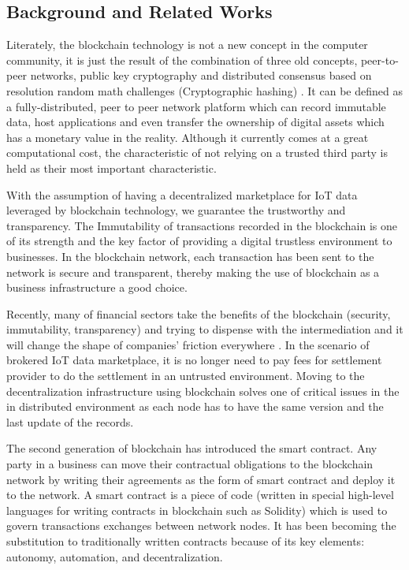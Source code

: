 \documentclass[letterpaper, 10 pt, conference]{ieeeconf}  %
\begin{document}
\subsection{Background and Related Works} \label{RelatedWork&Background}

Literately, the blockchain technology is not a new concept in the computer community, it is just the result of the combination of three old concepts, peer-to-peer networks, public key cryptography and distributed consensus based on resolution random math challenges (Cryptographic hashing) \cite{2}. It can be defined as a fully-distributed, peer to peer network platform which can record immutable data, host applications \cite{2} and even transfer the ownership of digital assets which has a monetary value in the reality. Although it currently comes at a great computational cost, the characteristic of not relying on a trusted third party is held as their most important characteristic.

With the assumption of having a decentralized marketplace for IoT data leveraged by blockchain technology, we guarantee the trustworthy and transparency. The Immutability of transactions recorded in the blockchain is one of its strength and the key factor of providing a digital trustless environment to businesses. In the blockchain network, each transaction has been sent to the network is secure and transparent, thereby making the use of blockchain as a business infrastructure a good choice.

Recently, many of financial sectors take the benefits of the blockchain (security, immutability, transparency) and trying to dispense with the intermediation and it will change the shape of companies’ friction everywhere \cite{2}\cite{9}\cite{10}. In the scenario of brokered IoT data marketplace, it is no longer need to pay fees for settlement provider to do the settlement in an untrusted environment. Moving to the decentralization infrastructure using blockchain solves one of critical issues in the in distributed environment as each node has to have the same version and the last update of the records.

The second generation of blockchain has introduced the smart contract. Any party in a business can move their contractual obligations to the blockchain network by writing their agreements as the form of smart contract and deploy it to the network. A smart contract is a piece of code (written in special high-level languages for writing contracts in blockchain such as Solidity) which is used to govern transactions exchanges between network nodes. It has been becoming the substitution to traditionally written contracts because of its key elements: autonomy, automation, and decentralization\cite{8}.  
\end{document}
